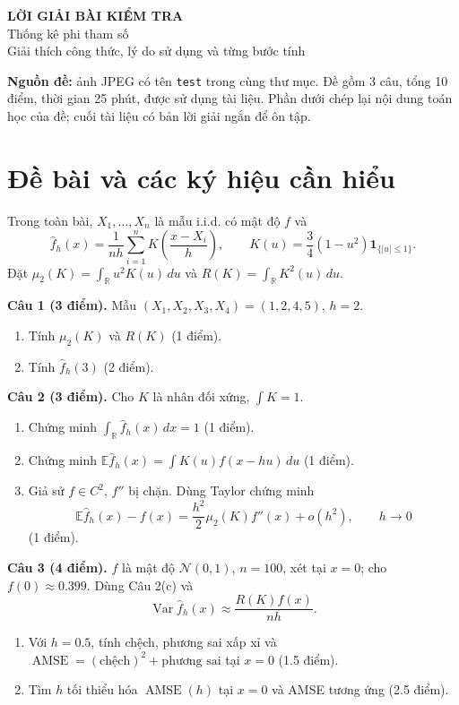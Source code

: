 \documentclass[11pt,a4paper]{article}
\newcommand{\E}{\mathbb E}
\newcommand{\R}{\mathbb R}
\newcommand{\fh}{\widehat f_h}
\DeclareMathOperator{\Var}{Var}
\DeclareMathOperator{\AMSE}{AMSE}
\begin{document}
\begin{center}
{\LARGE\bfseries LỜI GIẢI BÀI KIỂM TRA}\\[5pt]
{\Large Thống kê phi tham số}\\[5pt]
{\normalsize Giải thích công thức, lý do sử dụng và từng bước tính}
\end{center}

\textbf{Nguồn đề:} ảnh JPEG có tên \texttt{test} trong cùng thư mục. Đề gồm 3 câu, tổng 10 điểm, thời gian 25 phút, được sử dụng tài liệu. Phần dưới chép lại nội dung toán học của đề; cuối tài liệu có bản lời giải ngắn để ôn tập.

\section*{Đề bài và các ký hiệu cần hiểu}
Trong toàn bài, $X_1,\ldots,X_n$ là mẫu i.i.d. có mật độ $f$ và
\[
\fh(x)=\frac{1}{nh}\sum_{i=1}^nK\!\left(\frac{x-X_i}{h}\right),
\qquad K(u)=\frac34(1-u^2)\mathbf1_{\{|u|\leq1\}}.
\]
Đặt $\mu_2(K)=\int_{\R}u^2K(u)\,du$ và $R(K)=\int_{\R}K^2(u)\,du$.

\textbf{Câu 1 (3 điểm).} Mẫu $(X_1,X_2,X_3,X_4)=(1,2,4,5)$, $h=2$.
\begin{enumerate}[label=(\alph*)]
\item Tính $\mu_2(K)$ và $R(K)$ (1 điểm).
\item Tính $\fh(3)$ (2 điểm).
\end{enumerate}
\textbf{Câu 2 (3 điểm).} Cho $K$ là nhân đối xứng, $\int K=1$.
\begin{enumerate}[label=(\alph*)]
\item Chứng minh $\int_{\R}\fh(x)\,dx=1$ (1 điểm).
\item Chứng minh $\E\fh(x)=\int K(u)f(x-hu)\,du$ (1 điểm).
\item Giả sử $f\in C^2$, $f''$ bị chặn. Dùng Taylor chứng minh
\[
\E\fh(x)-f(x)=\frac{h^2}{2}\mu_2(K)f''(x)+o(h^2),\qquad h\to0
\]
(1 điểm).
\end{enumerate}
\textbf{Câu 3 (4 điểm).} $f$ là mật độ $\mathcal N(0,1)$, $n=100$, xét tại $x=0$; cho $f(0)\approx0.399$. Dùng Câu 2(c) và
\[
\Var\fh(x)\approx\frac{R(K)f(x)}{nh}.
\]
\begin{enumerate}[label=(\alph*)]
\item Với $h=0.5$, tính chệch, phương sai xấp xỉ và $\AMSE=(\text{chệch})^2+\text{phương sai}$ tại $x=0$ (1.5 điểm).
\item Tìm $h$ tối thiểu hóa $\AMSE(h)$ tại $x=0$ và AMSE tương ứng (2.5 điểm).
\end{enumerate}
\end{document}
